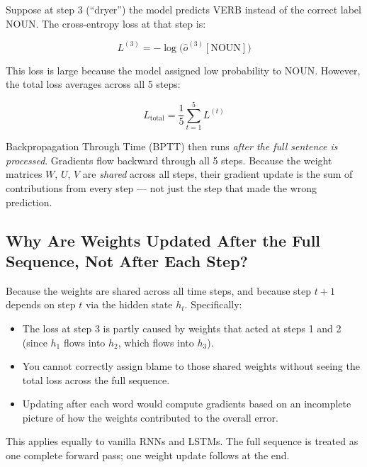 Suppose at step 3 (``dryer'') the model predicts VERB instead of the correct label NOUN.
The cross-entropy loss at that step is:

\begin{equation}
    L^{(3)} = -\log\!\bigl(\hat{o}^{(3)}[\text{NOUN}]\bigr)
\end{equation}

This loss is large because the model assigned low probability to NOUN. However,
the total loss averages across all 5 steps:

\begin{equation}
    L_{\text{total}} = \frac{1}{5}\sum_{t=1}^{5} L^{(t)}
\end{equation}

Backpropagation Through Time (BPTT) then runs \emph{after the full sentence is
processed}. Gradients flow backward through all 5 steps. Because the weight matrices
$W$, $U$, $V$ are \emph{shared} across all steps, their gradient update is the sum of
contributions from every step --- not just the step that made the wrong prediction.

\subsection{Why Are Weights Updated After the Full Sequence, Not After Each Step?}

Because the weights are shared across all time steps, and because step $t+1$ depends
on step $t$ via the hidden state $h_t$. Specifically:

\begin{itemize}
    \item The loss at step 3 is partly caused by weights that acted at steps 1 and 2
          (since $h_1$ flows into $h_2$, which flows into $h_3$).
    \item You cannot correctly assign blame to those shared weights without seeing
          the total loss across the full sequence.
    \item Updating after each word would compute gradients based on an incomplete
          picture of how the weights contributed to the overall error.
\end{itemize}

This applies equally to vanilla RNNs and LSTMs. The full sequence is treated as one
complete forward pass; one weight update follows at the end.

